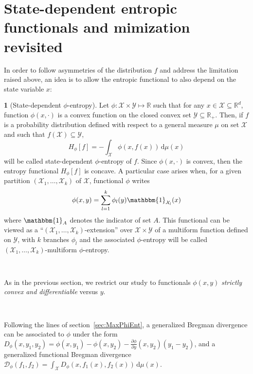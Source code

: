 \documentclass[english,sort&compress]{elsarticle}
\theoremstyle{definition}
\newtheorem{defn}{\protect\definitionname}
\theoremstyle{plain}
\theoremstyle{plain}
\providecommand{\definitionname}{Definition}
\def\dmu{\mathrm{d}\mu}
\def\fD{\mathcal{D}}
\def\Rset{\mathbb{R}}
\def\X{\mathcal{X}}
\def\Y{\mathcal{Y}}
\def\un{\mathbbm{1}}
\begin{document}

\section{State-dependent entropic functionals and mimization revisited}
\label{sec:MultiformEnt}

In order to follow asymmetries of the distribution $f$ and address the limitation
raised above, an idea is to allow the entropic functional to also depend on
the state variable $x$:
%
\begin{defn}[State-dependent $\phi$-entropy]\label{def:asym_phi-entropy}
  Let $\phi: \X \times  \Y \mapsto \Rset$ such that for any  $x \in \X \subseteq
  \Rset^d$, function $\phi(x,\cdot)$  is a convex function on  the closed convex
  set  $\Y \subseteq  \Rset_+$.   Then,  if $f$  is  a probability  distribution
  defined with  respect to  a general measure  $\mu$ on  set $\X$ and  such that
  $f(\X) \subseteq \Y$,
  \begin{equation}\label{eq:asym_phi-entropy}
    H_\phi[f] = - \int_\X \phi(x,f(x)) \, \dmu(x)
  \end{equation}
  will be  called state-dependent $\phi$-entropy of  $f$.  Since $\phi(x,\cdot)$
  is convex, then the entropy functional $H_\phi[f]$ is concave.
  A particular case arises when, for  a given partition $(\X_1 , \ldots , \X_k)$
  of $\X$, functional $\phi$ writes
  \begin{equation}\label{eq:multiform_phi-entropy}
    \phi(x,y) = \sum_{l=1}^k \phi_l(y) \un_{\X_l}(x)
  \end{equation}
  where $\un_A$ denotes the indicator of set $A$.  This functional can be viewed
  as a ``$(\X_1 , \ldots , \X_k)$-extension'' over $\X \times \Y$ of a multiform
  function  defined on  $\Y$,  with  $k$ branches  $\phi_l$  and the  associated
  $\phi$-entropy   will   be  called   $(\X_1   ,   \ldots  ,   \X_k)$-multiform
  $\phi$-entropy.
\end{defn}

\

As in  the previous  section, we restrict  our study to  functionals $\phi(x,y)$
{\em strictly convex and differentiable} versus $y$.

\

Following  the  lines  of  section~\ref{sec:MaxPhiEnt},  a  generalized  Bregman
divergence  can be  associated to  $\phi$  under the  form $D_\phi(x,y_1,y_2)  =
\phi(x,y_1) - \phi(x,y_2) - \frac{\partial \phi}{\partial y}(x,y_2) \left( y_1 -
  y_2 \right)$,  and a generalized functional  Bregman divergence $\displaystyle
\fD_\phi(f_1,f_2) = \int_\X D_\phi(x,f_1(x),f_2(x)) \, \dmu(x)$.
\end{document}
